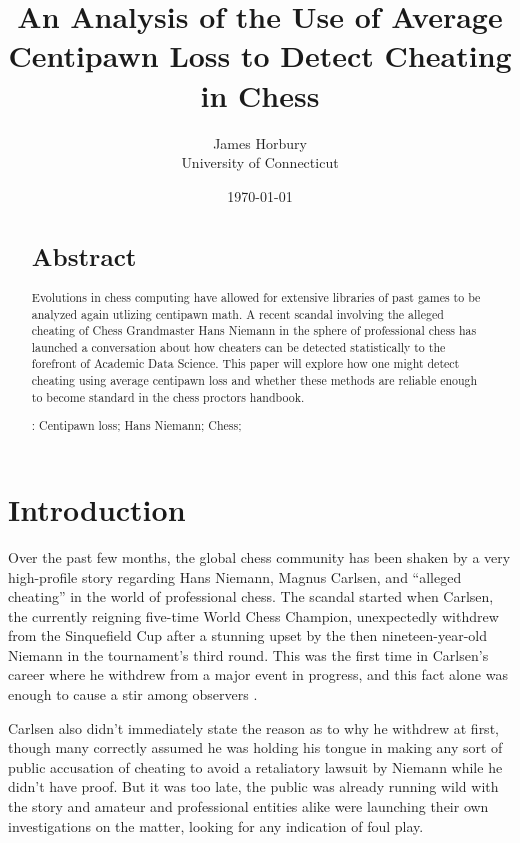 \documentclass[12pt, letterpaper, titlepage]{article}
\title{An Analysis of the Use of Average Centipawn Loss to Detect Cheating in Chess}
\author{James Horbury\\
    University of Connecticut
}
\date{\today}
\begin{document}
\maketitle

\doublespace

\begin{abstract}
\section*{Abstract}
\label{sec:abs}

Evolutions in chess computing have allowed for extensive libraries of past games to be analyzed again utlizing centipawn math. A recent scandal involving the alleged cheating of Chess Grandmaster Hans Niemann in the sphere of professional chess has launched a conversation about how cheaters can be detected statistically to the forefront of Academic Data Science. This paper will explore how one might detect cheating using average centipawn loss and whether these methods are reliable enough to become standard in the chess proctors handbook.

\bigskip
\noindent{}:
Centipawn loss; 
Hans Niemann;
Chess;
\end{abstract}

\section*{Introduction}
\label{sec:intro}

Over the past few months, the global chess community has been shaken by a very high-profile story regarding Hans Niemann, Magnus Carlsen,  and “alleged cheating” in the world of professional chess. The scandal started when Carlsen, the currently reigning five-time World Chess Champion, unexpectedly withdrew from the Sinquefield Cup after a stunning upset by the then nineteen-year-old Niemann in the tournament's third round. This was the first time in Carlsen's career where he withdrew from a major event in progress, and this fact alone was enough to cause a stir among observers \citep{wsj2022}.

Carlsen also didn't immediately state the reason as to why he withdrew at first, though many correctly assumed he was holding his tongue in making any sort of public accusation of cheating to avoid a retaliatory lawsuit by Niemann while he didn't have proof. But it was too late, the public was already running wild with the story and amateur and professional entities alike were launching their own investigations on the matter, looking for any indication of foul play.
\end{document}
